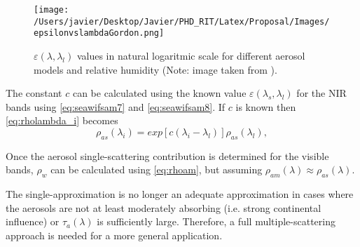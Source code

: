 \begin{figure}[htb]
  \centering
  \texttt{[image: /Users/javier/Desktop/Javier/PHD\_RIT/Latex/Proposal/Images/epsilonvslambdaGordon.png]}
  \caption{$\varepsilon(\lambda,\lambda_l)$ values in natural logaritmic scale for different aerosol models and relative humidity (Note: image taken from \cite{Gordon:1997}). \label{fig:epsilonvslambda} } 
\end{figure}

The constant $c$ can be calculated using the known value $\varepsilon(\lambda_s,\lambda_l)$ for the NIR bands using \autoref{eq:seawifsam7} and \autoref{eq:seawifsam8}. If $c$ is known then \autoref{eq:rholambda_i} becomes
\begin{equation}\label{eq:rholambda_ifinal}
  \rho_{as}(\lambda_i) = exp[c(\lambda_i-\lambda_l)]\rho_{as}(\lambda_l),
\end{equation}

Once the aerosol single-scattering contribution is determined for the visible bands, $\rho_w$ can be calculated using \autoref{eq:rhoam}, but assuming $\rho_{am}(\lambda)\approx\rho_{as}(\lambda)$. 

The single-approximation is no longer an adequate approximation in cases where the aerosols are not at least moderately absorbing (i.e. strong continental influence) or $\tau_a(\lambda)$ is sufficiently large. Therefore, a full multiple-scattering approach is needed for a more general application.



